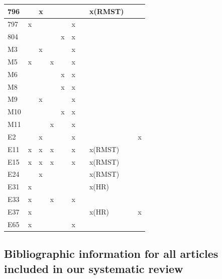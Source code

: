 \begin{landscape}
\begin{longtable}{|p{0.3in}|p{0.4in}|p{0.4in}|p{0.4in}|p{0.3in}|p{0.4in}|p{0.4in}|p{1.0in}|p{0.65in}|p{0.8in}|}
796 &  & x &  &  &  &  & x(RMST) &  &  \\ \hline 
797 & x &  &  &  & x &  &  &  &  \\ \hline 
804 &  &  &  & x & x &  &  &  &  \\ \hline 
M3 &  & x &  &  & x &  &  &  &  \\ \hline 
M5 & x &  & x &  & x &  &  &  &  \\ \hline 
M6 &  &  &  & x & x &  &  &  &  \\ \hline 
M8 &  &  &  & x & x &  &  &  &  \\ \hline 
M9 &  & x &  &  & x &  &  &  &  \\ \hline 
M10 &  &  &  & x & x &  &  &  &  \\ \hline 
M11 &  &  & x &  & x &  &  &  &  \\ \hline 
E2 &  & x &  &  & x &  &  &  & x \\ \hline 
E11 & x & x & x &  & x &  & x(RMST) &  &  \\ \hline 
E15 & x & x & x &  & x &  & x(RMST) &  &  \\ \hline 
E24 &  & x &  &  &  &  & x(RMST) &  &  \\ \hline 
E31 & x &  &  &  &  &  & x(HR) &  &  \\ \hline 
E33 & x &  & x &  & x &  &  &  &  \\ \hline 
E37 & x &  &  &  &  &  & x(HR) &  & x \\ \hline 
E65 & x &  &  &  & x &  &  &  &  \\ \hline 
\end{longtable}

\newpage
\subsection{Bibliographic information for all articles included in our systematic review}\label{completebib}

       

\end{landscape}
